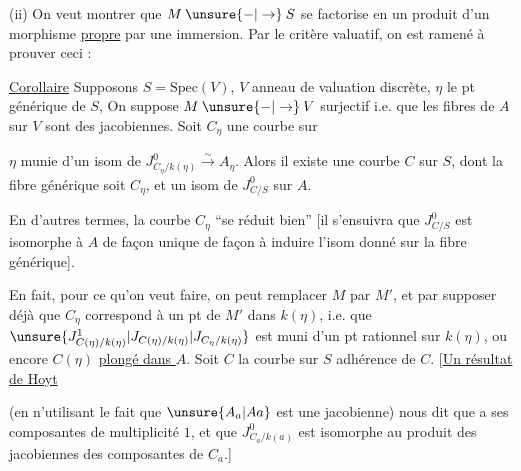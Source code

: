 (ii) On veut montrer que $M\mathbin{\unsure{-|\to}}S$ se factorise en un produit d'un morphisme \uline{propre} par une immersion. Par le critère valuatif, on est ramené à prouver ceci :

\uline{Corollaire} Supposons $S=\mathrm{Spec}(V)$, $V$ anneau de valuation discrète,  $\eta$ le pt générique de $S$,  On suppose $M\mathbin{\unsure{-|\to}}V$ surjectif i.e. que les fibres de $A$ sur $V$ sont des jacobiennes.  Soit $C_\eta$ une courbe sur



$\eta$ munie d'un isom  de $J^0_{C_\eta/k(\eta)}\xrightarrow{\sim}A_\eta$. Alors il existe une courbe $C$ sur $S$,  dont la fibre générique soit $C_\eta$, et un isom de $J^0_{C/S}$ sur $A$.

En d'autres termes, la courbe $C_\eta$ ``se réduit bien'' [il s'ensuivra que $J^0_{C/S}$ est  isomorphe à $A$ de façon unique de façon à induire l'isom donné sur la fibre générique].


 En fait, pour ce qu'on veut faire, on peut  remplacer $M$ par $M'$, et par  supposer déjà que $C_\eta$ correspond à un pt de $M'$ dans $k(\eta)$, i.e. que $\unsure{J^1_{C(\eta)/k(\eta)}|J_{C(\eta)/k(\eta)}|J_{C_\eta/k(\eta)}}$ est muni d'un pt rationnel sur $k(\eta)$, ou encore $C(\eta)$ \uline{plongé dans $A$}.  Soit $C$ la courbe sur $S$ adhérence de $C$. [\uline{Un résultat de Hoyt}



(en n'utilisant  le fait que $\unsure{A_a|Aa}$ est une jacobienne) nous dit que   a  ses composantes de multiplicité $1$, et que $J^0_{C_a/k(a)}$ est isomorphe au produit des jacobiennes des composantes de $C_a$.]

